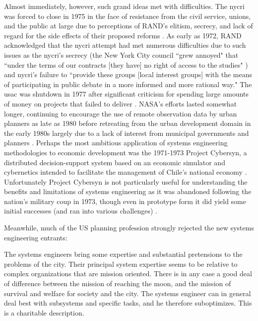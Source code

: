 Almost immediately, however, such grand ideas met with difficulties. The \ac{nycri} was forced to close in 1975 in the face of resistance from the civil service, unions, and the public at large due to perceptions of RAND's elitism, secrecy, and lack of regard for the side effects of their proposed reforms \cite{lightWarfareWelfareDefense2005}. As early as 1972, RAND acknowledged that the \ac{nycri} attempt had met numerous difficulties due to such issues as the \ac{nycri}'s secrecy (the New York City council ``grew annoyed" that ``under the terms of our contracts [they have] no right of access to the studies" \cite{szantonAnalysisUrbanGovernment1972}) and \ac{nycri}'s failure to ``provide these groups [local interest groups] with the means of participating in public debate in a more informed and more rational way." \cite{szantonAnalysisUrbanGovernment1972} The \ac{usac} was shutdown in 1977 after significant criticism for spending large amounts of money on projects that failed to deliver \cite{kraemerRequiemUSAC1979}. NASA's efforts lasted somewhat longer, continuing to encourage the use of remote observation data by urban planners as late as 1980 \cite{rushRemoteSensingUtility1976, haggertySpinoff19801980} before retreating from the urban development domain in the early 1980s largely due to a lack of interest from municipal governments and planners \cite{lightWarfareWelfareDefense2005}. Perhaps the most ambitious application of systems engineering methodologies to economic development was the 1971-1973 Project Cybersyn, a distributed decision-support system based on an economic simulator and cybernetics intended to facilitate the management of Chile's national economy \cite{medinaCyberneticRevolutionariesTechnology2011}. Unfortunately Project Cybersyn is not particularly useful for understanding the benefits and limitations of systems engineering as it was abandoned following the nation's military coup in 1973, though even in prototype form it did yield some initial successes (and ran into various challenges) \cite{medinaDesigningFreedomRegulating2006}. 

Meanwhile, much of the US planning profession strongly rejected the new systems engineering entrants:

\begin{singlespcquote}
The systems engineers bring some expertise and substantial pretensions to the problems of the city. Their principal system expertise seems to be relative to complex organizations that are mission oriented. There is in any case a good deal of difference between the mission of reaching the moon, and the mission of survival and welfare for society and the city. The systems engineer can in general deal best with subsystems and specific tasks, and he therefore suboptimizes. This is a charitable description. \cite{robinsonDecisionmakingUrbanPlanning1972}
\end{singlespcquote}

